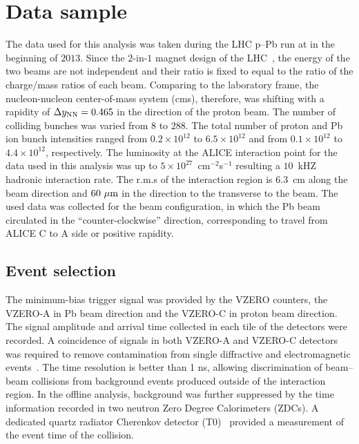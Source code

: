 
\section{Data sample}

The data used for this analysis was taken during the LHC p--Pb run at  in the beginning of $2013$.
Since the $2$-in-$1$ magnet design of the LHC~\cite{Evans:2008zzb}, the energy of the two beams are not independent and their ratio is fixed to equal to the ratio of the charge/mass ratios of each beam.
Comparing to the laboratory frame, the nucleon-nucleon center-of-mass system (cms), therefore, was shifting with a rapidity of $\Delta y_{\rm NN}=0.465$ in the direction of the proton beam.
The number of colliding bunches was varied from $8$ to $288$. The total number of proton and Pb ion bunch intensities ranged from $0.2\times 10^{12}$ to $6.5\times 10^{12}$ and from $0.1\times 10^{12}$ to $4.4\times 10^{12}$, respectively.
The luminosity at the ALICE interaction point for the data used in this analysis was up to $5\times 10^{27}$~cm$^{-2}$s$^{-1}$ resulting a $10$~kHZ hadronic interaction rate. The r.m.s of the interaction region is $6.3$~cm along the beam direction and $60~\mu{\rm m}$ in the direction to the transverse to the beam. The used data was collected for the beam configuration, in which the Pb beam circulated in the ``counter-clockwise'' direction, corresponding to travel from ALICE C to A side or positive rapidity.

\subsection{Event selection}

The minimum-bias trigger signal was provided by the VZERO counters, the VZERO-A in Pb beam direction and the VZERO-C in proton beam direction. The signal amplitude and arrival time collected in each tile of the detectors were recorded. A coincidence of signals in both VZERO-A and VZERO-C detectors was required to remove contamination from single diffractive and electromagnetic events~\cite{ALICE:2012xs}. The time resolution is better than 1 ns, allowing discrimination of beam--beam collisions from background events produced outside of the interaction region. In the offline analysis, background was further suppressed by the time information recorded in two neutron Zero Degree Calorimeters (ZDCs). A dedicated quartz radiator Cherenkov detector (T0)~\cite{Akindinov:2013tea} provided a measurement of the event time of the collision.

